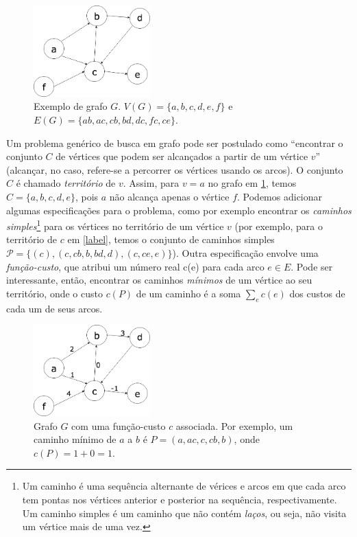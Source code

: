 \begin{figure}[!h]
  \centering
  \includegraphics[width=0.4\textwidth]{picstcc/graph.png}
  \caption{Exemplo de grafo $G$. $V(G) = \{a,b,c,d,e,f\}$ e $E(G) =\{ab, ac, cb, bd, dc, fc, ce\}$.}
  \label{graph}
\end{figure}

Um problema genérico de busca em grafo pode ser postulado como ``encontrar o conjunto $C$ de vértices que podem ser alcançados a partir de um vértice $v$'' (alcançar, no caso, refere-se a percorrer os vértices usando os arcos). O conjunto $C$ é chamado \textit{território} de $v$. Assim, para $v = a$ no grafo em \ref{graph}, temos $C = \{ a, b, c, d, e\}$, pois $a$ não alcança apenas o vértice $f$. Podemos adicionar algumas especificações para o problema, como por exemplo encontrar os \textit{caminhos simples}\footnote{Um caminho é uma sequência alternante de vérices e arcos em que cada arco tem pontas nos vértices anterior e posterior na sequência, respectivamente. Um caminho simples é um caminho que não contém \textit{laços}, ou seja, não visita um vértice mais de uma vez.} para os vértices no território de um vértice $v$ (por exemplo, para o território de $c$ em \ref{label}, temos o conjunto de caminhos simples $\mathcal{P} = \{(c), (c,cb,b,bd,d), (c, ce, e)\}$). Outra especificação envolve uma \textit{função-custo}, que atribui um número real c(e) para cada arco $e \in E$. Pode ser interessante, então, encontrar os caminhos \textit{mínimos} de um vértice ao seu território, onde o custo $c(P)$ de um caminho é a soma $\sum_ec(e)$ dos custos de cada um de seus arcos.

\begin{figure}[!h]
  \centering
  \includegraphics[width=0.4\textwidth]{picstcc/costedgraph.png}
  \caption{Grafo $G$ com uma função-custo $c$ associada. Por exemplo, um caminho mínimo de $a$ a $b$ é $P = (a, ac, c, cb, b)$, onde $c(P) = 1 + 0 = 1.$}
  \label{costedgraph}
\end{figure}

